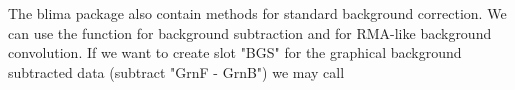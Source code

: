 The blima package also contain methods for standard background correction. We can use the function  for background subtraction and  for RMA-like background convolution. If we want to create slot "BGS" for the graphical background subtracted data (subtract "GrnF - GrnB") we may call 